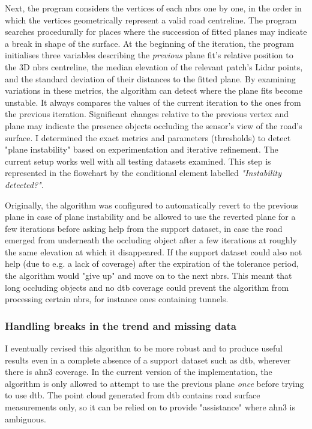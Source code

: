 Next, the program considers the vertices of each \ac{nbrs} one by one, in the order in which the vertices geometrically represent a valid road centreline. The program searches procedurally for places where the succession of fitted planes may indicate a break in shape of the surface. At the beginning of the iteration, the program initialises three variables describing the \textit{previous} plane fit's relative position to the 3D \ac{nbrs} centreline, the median elevation of the relevant patch's Lidar points, and the standard deviation of their distances to the fitted plane. By examining variations in these metrics, the algorithm can detect where the plane fits become unstable. It always compares the values of the current iteration to the ones from the previous iteration. Significant changes relative to the previous vertex and plane may indicate the presence objects occluding the sensor's view of the road's surface. I determined the exact metrics and parameters (thresholds) to detect "plane instability" based on experimentation and iterative refinement. The current setup works well with all testing datasets examined. This step is represented in the flowchart by the conditional element labelled \textit{"Instability detected?"}.

Originally, the algorithm was configured to automatically revert to the previous plane in case of plane instability and be allowed to use the reverted plane for a few iterations before asking help from the support dataset, in case the road emerged from underneath the occluding object after a few iterations at roughly the same elevation at which it disappeared. If the support dataset could also not help (due to e.g. a lack of coverage) after the expiration of the tolerance period, the algorithm would "give up" and move on to the next \ac{nbrs}. This meant that long occluding objects and no \ac{dtb} coverage could prevent the algorithm from processing certain \ac{nbrs}, for instance ones containing tunnels.

\subsubsection{Handling breaks in the trend and missing data}

I eventually revised this algorithm to be more robust and to produce useful results even in a complete absence of a support dataset such as \ac{dtb}, wherever there is \ac{ahn3} coverage. In the current version of the implementation, the algorithm is only allowed to attempt to use the previous plane \textit{once} before trying to use \ac{dtb}. The point cloud generated from \ac{dtb} contains road surface measurements only, so it can be relied on to provide "assistance" where \ac{ahn3} is ambiguous.

